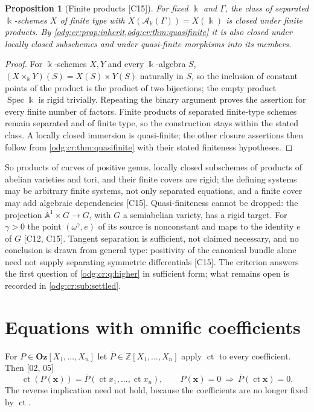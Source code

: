 \documentclass[11pt,oneside]{article}
\numberwithin{equation}{section}
\newtheorem{proposition}[proposition]{Proposition}
\theoremstyle{definition}
\theoremstyle{remark}
\newcommand{\Oz}{\mathbf{Oz}}
\newcommand{\Z}{\mathbb Z}
\newcommand{\ct}{\operatorname{ct}}
\newcommand{\src}[1]{\textup{\textsf{\small[#1]}}}
\newcommand{\crA}{\mathcal A_\Bbbk(\Gamma)}
\newcommand{\Aff}{\mathbb A}
\newcommand{\Spec}{\operatorname{Spec}}
\begin{document}
\begin{proposition}[Finite products \src{C15}]\label{odg:log:prop:products}
For fixed $\Bbbk$ and $\Gamma$, the class of separated $\Bbbk$-schemes $X$ of finite type
with $X(\crA)=X(\Bbbk)$ is closed under finite products. By
\cref{odg:cr:prop:inherit,odg:cr:thm:quasifinite} it is also closed under locally closed
subschemes and under quasi-finite morphisms into its members.
\end{proposition}
\begin{proof}
For $\Bbbk$-schemes $X,Y$ and every $\Bbbk$-algebra $S$,
$(X\times_\Bbbk Y)(S)=X(S)\times Y(S)$ naturally in $S$, so the inclusion of constant
points of the product is the product of two bijections; the empty product $\Spec\Bbbk$ is
rigid trivially. Repeating the binary argument proves the assertion for
every finite number of factors. Finite products of separated finite-type
schemes remain separated and of finite type, so the construction stays
within the stated class. A locally closed immersion is quasi-finite;
the other closure assertions then follow from
\cref{odg:cr:thm:quasifinite} with their stated finiteness hypotheses.
\end{proof}

So products of curves of positive genus, locally closed subschemes of products of abelian
varieties and tori, and their finite covers are rigid; the defining systems may be
arbitrary finite systems, not only separated equations, and a finite cover may add
algebraic dependencies \src{C15}. Quasi-finiteness cannot be dropped: the projection
$\Aff^1\times G\to G$, with $G$ a semiabelian variety, has a rigid target.
For $\gamma>0$ the point $(\omega^\gamma,e)$ of its source is nonconstant
and maps to the identity $e$ of $G$ \src{C12, C15}.
Tangent separation is sufficient, not claimed necessary, and no
conclusion is drawn from general type: positivity of the canonical bundle alone need not
supply separating symmetric differentials \src{C15}. The criterion answers the first
question of \cref{odg:cr:q:higher} in sufficient form; what remains open is recorded in
\cref{odg:cr:sub:settled}.

\section{Equations with omnific coefficients}\label{odg:sec:coefficients}

For $P\in\Oz[X_1,\ldots,X_n]$ let $\overline P\in\Z[X_1,\ldots,X_n]$ apply
$\ct$ to every coefficient. Then \src{02, 05}
\[
 \ct(P(\mathbf x))=\overline P(\ct x_1,\ldots,\ct x_n),\qquad
 P(\mathbf x)=0\ \Longrightarrow\ \overline P(\ct\mathbf x)=0 .
\]
The reverse implication need not hold, because the coefficients are no longer
fixed by $\ct$.
\end{document}
